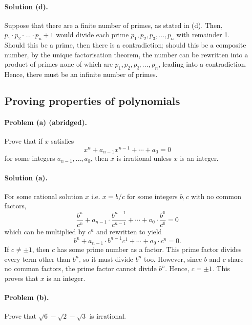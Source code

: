 \documentclass{article}
\begin{document}
\paragraph{Solution (d).} Suppose that there are a finite number of primes, as
stated in (d). Then, $p_1 \cdot p_2 \cdot \ldots \cdot p_n + 1$ would divide
each prime $p_1, p_2, p_3, \ldots, p_n$ with remainder 1. Should this be a
prime, then there is a contradiction; should this be a composite number, by the
unique factorisation theorem, the number can be rewritten into a product of
primes none of which are $p_1, p_2, p_3, \ldots, p_n$, leading into a
contradiction. Hence, there must be an infinite number of primes.

\setcounter{subsection}{17}
\subsection{Proving properties of polynomials}

\paragraph{Problem (a) (abridged).} Prove that if $x$ satisfies
\begin{equation*}
  x^n + a_{n-1}x^{n-1} + \cdots + a_0 = 0
\end{equation*} for some integers $a_{n-1}, \ldots, a_0$, then $x$ is
irrational unless $x$ is an integer.

\paragraph{Solution (a).} For some rational solution $x$ i.e. $x = b/c$ for
some integers $b, c$ with no common factors, \begin{equation*}
  \frac{b^n}{c^n} + a_{n-1} \cdot \frac{b^{n-1}}{c^{n-1}} + \cdots + a_0 \cdot
  \frac{b^0}{c^0} = 0
\end{equation*} which can be multiplied by $c^n$ and rewritten to yield
\begin{equation*}
  b^n + a_{n-1} \cdot b^{n-1}c^1 + \cdots + a_0 \cdot c^n = 0.
\end{equation*}
If $c \neq \pm1$, then $c$ has some prime number as a factor. This prime factor
divides every term other than $b^n$, so it must divide $b^n$ too. However,
since $b$ and $c$ share no common factors, the prime factor cannot divide
$b^n$. Hence, $c = \pm1$. This proves that $x$ is an integer.

\paragraph{Problem (b).} Prove that $\sqrt{6} - \sqrt{2} - \sqrt{3}$ is
irrational.
\end{document}
